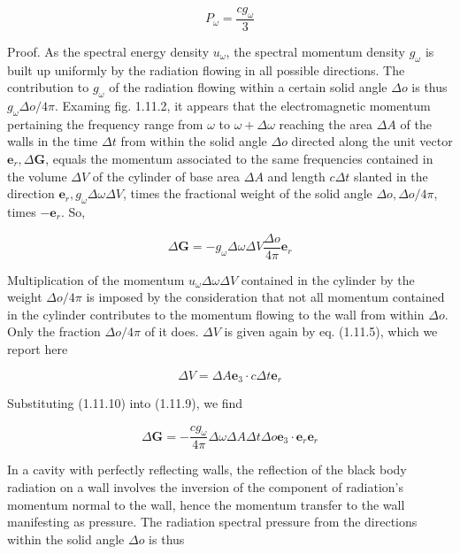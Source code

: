\documentclass{article}
\begin{document}
\begin{equation*}
P_{\omega}=\frac{c g_{\omega}}{3} \tag{1.11.8}
\end{equation*}
 

Proof. As the spectral energy density $u_{\omega}$, the spectral momentum density $g_{\omega}$ is built up uniformly by the radiation flowing in all possible directions. The contribution to $g_{\omega}$ of the radiation flowing within a certain solid angle $\Delta o$ is thus $g_{\omega} \Delta o / 4 \pi$. Examing fig. 1.11.2, it appears that the electromagnetic momentum pertaining the frequency range from $\omega$ to $\omega+\Delta \omega$ reaching the area $\Delta A$ of the walls in the time $\Delta t$ from within the solid angle $\Delta o$ directed along the unit vector $\boldsymbol{e}_{r}, \Delta \boldsymbol{G}$, equals the momentum associated to the same frequencies contained in the volume $\Delta V$ of the cylinder of base area $\Delta A$ and length $c \Delta t$ slanted in the direction $\boldsymbol{e}_{r}, g_{\omega} \Delta \omega \Delta V$, times the fractional weight of the solid angle $\Delta o, \Delta o / 4 \pi$, times $-\boldsymbol{e}_{r}$. So,
 
\begin{equation*}
\Delta \boldsymbol{G}=-g_{\omega} \Delta \omega \Delta V \frac{\Delta o}{4 \pi} \boldsymbol{e}_{r} \tag{1.11.9}
\end{equation*}
 

Multiplication of the momentum $u_{\omega} \Delta \omega \Delta V$ contained in the cylinder by the weight $\Delta o / 4 \pi$ is imposed by the consideration that not all momentum contained in the cylinder contributes to the momentum flowing to the wall from within $\Delta o$. Only the fraction $\Delta o / 4 \pi$ of it does. $\Delta V$ is given again by eq. (1.11.5), which we report here
 
\begin{equation*}
\Delta V=\Delta A \boldsymbol{e}_{3} \cdot c \Delta t \boldsymbol{e}_{r} \tag{1.11.10}
\end{equation*}
 

Substituting (1.11.10) into (1.11.9), we find
 
\begin{equation*}
\Delta \boldsymbol{G}=-\frac{c g_{\omega}}{4 \pi} \Delta \omega \Delta A \Delta t \Delta o \boldsymbol{e}_{3} \cdot \boldsymbol{e}_{r} \boldsymbol{e}_{r} \tag{1.11.11}
\end{equation*}
 

In a cavity with perfectly reflecting walls, the reflection of the black body radiation on a wall involves the inversion of the component of radiation's momentum normal to the wall, hence the momentum transfer to the wall manifesting as pressure. The radiation spectral pressure from the directions within the solid angle $\Delta o$ is thus
 
\end{document}
